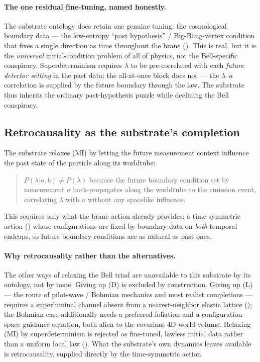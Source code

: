 \paragraph{The one residual fine-tuning, named honestly.}
The substrate ontology does retain one genuine tuning: the cosmological boundary data --- the
low-entropy ``past hypothesis'' / Big-Bang-vertex condition that fixes a single direction as time
throughout the brane ().
This is real, but it is the \emph{universal} initial-condition problem of all of physics, not the
Bell-specific conspiracy.
Superdeterminism requires $\lambda$ to be pre-correlated with each \emph{future detector setting}
in the past data; the all-at-once block does not --- the $\lambda$--$a$ correlation is supplied
by the future boundary through the law.
The substrate thus inherits the ordinary past-hypothesis puzzle while declining the Bell
conspiracy.

\subsection{Retrocausality as the substrate's completion}
\label{subsec:retrocausal-completion}

The substrate relaxes (MI) by letting the future measurement context influence the past state of
the particle along its worldtube:
\begin{quote}
  $P(\lambda | a, b) \neq P(\lambda)$ because the future boundary condition set by
  measurement $a$ back-propagates along the worldtube to the emission event, correlating
  $\lambda$ with $a$ without any spacelike influence.
\end{quote}
This requires only what the brane action already provides: a time-symmetric action
() whose configurations are fixed by boundary data on \emph{both} temporal
endcaps, so future boundary conditions are as natural as past ones.

\paragraph{Why retrocausality rather than the alternatives.}
The other ways of relaxing the Bell triad are unavailable to this substrate by its ontology, not
by taste. Giving up (D) is excluded by construction. Giving up (L) --- the route of pilot-wave /
Bohmian mechanics and most realist completions --- requires a superluminal channel absent from a
nearest-neighbor elastic lattice (); the Bohmian case additionally
needs a preferred foliation and a configuration-space guidance equation, both alien to the
covariant 4D world-volume. Relaxing (MI) by superdeterminism is rejected as fine-tuned, lawless
initial data rather than a uniform local law (). What the
substrate's own dynamics leaves available is retrocausality, supplied directly by the
time-symmetric action.

